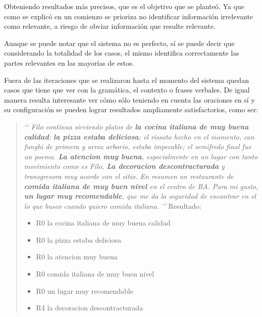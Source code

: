 Obteniendo resultados más precisos, que es el objetivo que se planteó. Ya que como se explicó en un comienzo se prioriza no identificar información irrelevante como relevante, a riesgo de obviar información que resulte relevante.

Aunque se puede notar que el sistema no es perfecto, sí se puede decir que considerando la totalidad de los casos, el mismo identifica correctamente las partes relevantes en las mayorías de estos.

Fuera de las iteraciones que se realizaron hasta el momento del sistema quedan casos que tiene que ver con la gramática, el contexto o frases verbales. De igual manera resulta interesante ver cómo sólo teniendo en cuenta las oraciones en sí y su configuración se pueden lograr resultados ampliamente satisfactorios, como ser:

\begin{quotation}
\emph{
\lq\lq{}
Filo continua sirviendo platos de {\bf la cocina italiana de muy buena calidad}: {\bf la pizza estaba deliciosa}; el rissoto hecho en el momento, con funghi de primera y arroz arborio, estaba  impecable; el semifredo final fue un poema.  {\bf La atencion muy buena}, especialmente en un lugar con tanto movimiento como es Filo, {\bf La decoracion descontracturada} y transgresora muy acorde con el sitio.  En resumen un restaurante de {\bf comida italiana de muy buen nivel} en el centro de BA.  Para mi gusto, {\bf un lugar muy recomendable}, que me da la seguridad de encontrar en el lo que busco cuando quiero comida italiana. 
\rq\rq{}
}
Resultado:
\begin{itemize}
\item R0 la cocina italiana de muy buena calidad
\item R0 la pizza estaba deliciosa
\item R0 la atencion muy buena
\item R0 comida italiana de muy buen nivel
\item R0 un lugar muy recomendable
\item R4  la decoracion descontracturada
\end{itemize}
\end{quotation}


